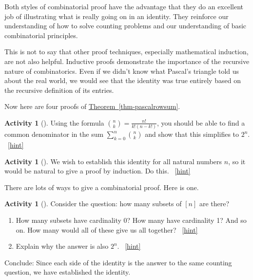 \documentclass[10pt,]{book}
\theoremstyle{plain}
\theoremstyle{definition}
\theoremstyle{definition}
\theoremstyle{definition}
\newtheorem{activity}[project]{Activity}
\numberwithin{equation}{chapter}
\begin{document}
\par
\hypertarget{p-122}{}%
Both styles of combinatorial proof have the advantage that they do an excellent job of illustrating what is really going on in an identity.  They reinforce our understanding of how to solve counting problems and our understanding of basic combinatorial principles.%
\par
\hypertarget{p-123}{}%
This is not to say that other proof techniques, especially mathematical induction, are not also helpful.  Inductive proofs demonstrate the importance of the recursive nature of combinatorics.  Even if we didn't know what Pascal's triangle told us about the real world, we would see that the identity was true entirely based on the recursive definition of its entries.%
\par
\hypertarget{p-124}{}%
Now here are four proofs of \hyperref[thm-pascalrowsum]{Theorem~\ref{thm-pascalrowsum}}.%
\begin{activity}[]\label{act-pascalrowsum-alg}
\hypertarget{p-125}{}%
Using the formula \(\binom{n}{k} = \frac{n!}{k!(n-k!)}\), you should be able to find a common denominator in the sum \(\sum_{k=0}^n \binom{n}{k}\) and show that this simplifies to \(2^n\).%
~\hfill{\tiny\hyperlink{a-14}{[hint]}\hypertarget{q-14}{}}\end{activity}
\begin{activity}[]\label{activity-15}
\hypertarget{p-127}{}%
We wish to establish this identity for all natural numbers \(n\), so it would be natural to give a proof by induction.  Do this.%
~\hfill{\tiny\hyperlink{a-15}{[hint]}\hypertarget{q-15}{}}\end{activity}
\hypertarget{p-132}{}%
There are lots of ways to give a combinatorial proof.  Here is one.%
\begin{activity}[]\label{activity-pascalrow-dc}
\hypertarget{p-133}{}%
Consider the question: how many subsets of \([n]\) are there?%
\begin{enumerate}[font=\bfseries,label=(\alph*),ref=\alph*]
\item\label{task-40} \hypertarget{p-134}{}%
How many subsets have cardinality 0?  How many have cardinality 1?  And so on.  How many would all of these give us all together?%
~\hfill{\tiny\hyperlink{a-16.a}{[hint]}\hypertarget{q-16.a}{}}\item\label{task-41} \hypertarget{p-137}{}%
Explain why the answer is also \(2^n\).%
~\hfill{\tiny\hyperlink{a-16.b}{[hint]}\hypertarget{q-16.b}{}}\end{enumerate}
\bigbreak
\hypertarget{p-140}{}%
Conclude: Since each side of the identity is the answer to the same counting question, we have established the identity.%
\end{activity}
\end{document}
